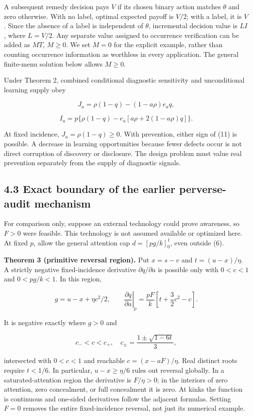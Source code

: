 \documentclass[
  11pt,
]{article}
\begin{document}
A subsequent remedy decision pays \(V\) if its chosen binary action
matches \(\theta\) and zero otherwise. With no label, optimal expected
payoff is \(V/2\); with a label, it is \(V\). Since the absence of a
label is independent of \(\theta\), incremental decision value is
\(LI\), where \(L=V/2\). Any separate value assigned to occurrence
verification can be added as \(MT\), \(M\geq0\). We set \(M=0\) for the
explicit example, rather than counting occurrence information as
worthless in every application. The general finite-menu solution below
allows \(M\geq0\).

Under Theorem 2, combined conditional diagnostic sensitivity and
unconditional learning supply obey

\[J_a=\rho(1-q)-(1-a\rho)e_aq,\]

\[I_a=p\{\rho(1-q)-e_a[a\rho+2(1-a\rho)q]\}. \tag{11}\]

At fixed incidence, \(J_a=\rho(1-q)\geq0\). With prevention, either sign
of (11) is possible. A decrease in learning opportunities because fewer
defects occur is not direct corruption of discovery or disclosure. The
design problem must value real prevention separately from the supply of
diagnostic signals.

\subsection{4.3 Exact boundary of the earlier perverse-audit
mechanism}\label{exact-boundary-of-the-earlier-perverse-audit-mechanism}

For comparison only, suppose an external technology could prove
awareness, so \(F>0\) were feasible. This technology is not assumed
available or optimized here. At fixed \(p\), allow the general attention
cap \(d=[pg/k]_0^1\), even outside (6).

\textbf{Theorem 3 (primitive reversal region).} Put \(x=s-v\) and
\(t=(u-x)/\eta\). A strictly negative fixed-incidence derivative
\(\partial q/\partial a\) is possible only with \(0<c<1\) and
\(0<pg/k<1\). In this region,

\[g=u-x+\eta c^2/2,\qquad
 \left.\frac{\partial q}{\partial a}\right|_p
 =\frac{pF}{k}\left[t+\frac32c^2-c\right]. \tag{12}\]

It is negative exactly where \(g>0\) and

\[c_-<c<c_+,\quad
 c_\pm=\frac{1\pm\sqrt{1-6t}}{3}, \tag{13}\]

intersected with \(0<c<1\) and reachable \(c=(x-aF)/\eta\). Real
distinct roots require \(t<1/6\). In particular, \(u-x\geq\eta/6\) rules
out reversal globally. In a saturated-attention region the derivative is
\(F/\eta>0\); in the interiors of zero attention, zero concealment, or
full concealment it is zero. At kinks the function is continuous and
one-sided derivatives follow the adjacent formulas. Setting \(F=0\)
removes the entire fixed-incidence reversal, not just its numerical
example.
\end{document}

